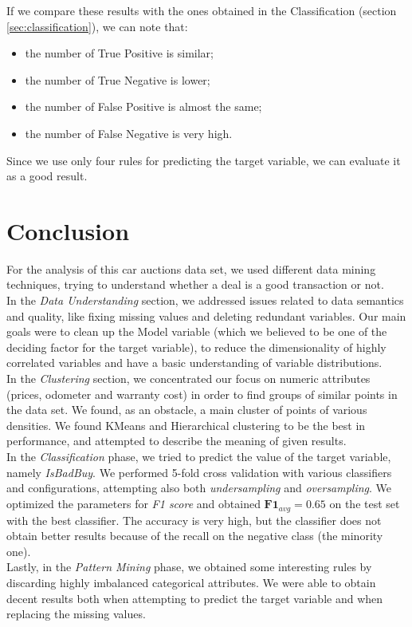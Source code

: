 \documentclass{article}
\begin{document}
	If we compare these results with the ones obtained in the Classification (section \ref{sec:classification}), we can note that:
	\begin{itemize}
		\item the number of True Positive is similar;
		\item the number of True Negative is lower;
		\item the number of False Positive is almost the same;
		\item the number of False Negative is very high.
	\end{itemize}{}
	
	Since we use only four rules for predicting the target variable, we can evaluate it as a good result.
	
	
	\section{Conclusion}
	
	For the analysis of this car auctions data set, we used different data mining techniques, trying to understand whether a deal is a good transaction or not. \\
	In the \emph{Data Understanding} section, we addressed issues related to data semantics and quality, like fixing missing values and deleting redundant variables. Our main goals were to clean up the Model variable (which we believed to be one of the deciding factor for the target variable), to reduce the dimensionality of highly correlated variables and have a basic understanding of variable distributions.\\
	In the \emph{Clustering} section, we concentrated our focus on numeric attributes (prices, odometer and warranty cost) in order to find groups of similar points in the data set. We found, as an obstacle, a main cluster of points of various densities. We found KMeans and Hierarchical clustering to be the best in performance, and attempted to describe the meaning of given results.\\
	In the \emph{Classification} phase, we tried to predict the value of the target variable, namely \emph{IsBadBuy}. We performed 5-fold cross validation with various classifiers and configurations, attempting also both \emph{undersampling} and \emph{oversampling}. We optimized the parameters for \emph{F1 score} and obtained $\mathbf{F1}_{avg} = 0.65$ on the test set with the best classifier. The accuracy is very high, but the classifier does not obtain better results because of the recall on the negative class (the minority one).  \\
	Lastly, in the \emph{Pattern Mining} phase, we obtained some interesting rules by discarding highly imbalanced categorical attributes. We were able to obtain decent results both when attempting to predict the target variable and when replacing the missing values.
	
\end{document}
